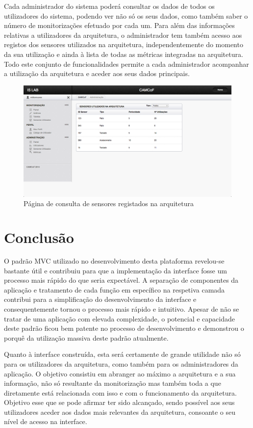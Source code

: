 Cada administrador do sistema poderá consultar os dados de todos os utilizadores do sistema, podendo ver não só os seus dados, como também saber o número de monitorizações efetuado por cada um. Para além das informações relativas a utilizadores da arquitetura, o administrador tem também acesso aos registos dos sensores utilizados na arquitetura, independentemente do momento da sua utilização e ainda à lista de todas as métricas integradas na arquitetura. Todo este conjunto de funcionalidades permite a cada administrador acompanhar a utilização da arquitetura e aceder aos seus dados principais.

\begin{figure}[htb]
   \centering
   \includegraphics[scale=0.29]{Images/sensores.png}
   \caption{Página de consulta de sensores registados na arquitetura}
\end{figure}


\section{Conclusão}

O padrão MVC utilizado no desenvolvimento desta plataforma revelou-se bastante útil e contribuiu para que a implementação da interface fosse um processo mais rápido do que seria expectável. A separação de componentes da aplicação e tratamento de cada função em específico na respetiva camada contribui para a simplificação do desenvolvimento da interface e consequentemente tornou o processo mais rápido e intuitivo. Apesar de não se tratar de uma aplicação com elevada complexidade, o potencial e capacidade deste padrão ficou bem patente no processo de desenvolvimento e demonstrou o porquê da utilização massiva deste padrão atualmente.

Quanto à interface construída, esta será certamente de grande utilidade não só para os utilizadores da arquitetura, como também para os administradores da aplicação. O objetivo consistiu em abranger ao máximo a arquitetura e a sua informação, não só resultante da monitorização mas também toda a que diretamente está relacionada com isso e com o funcionamento da arquitetura. Objetivo esse que se pode afirmar ter sido alcançado, sendo possível aos seus utilizadores aceder aos dados mais relevantes da arquitetura, consoante o seu nível de acesso na interface.

